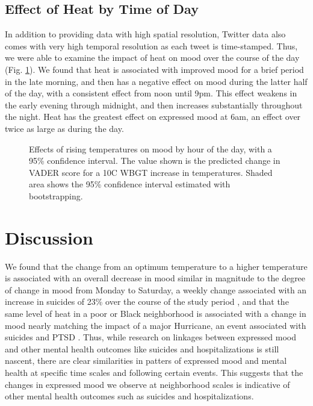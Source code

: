 \documentclass[titlepage]{article}
\begin{document}
\subsection*{Effect of Heat by Time of Day}
In addition to providing data with high spatial resolution, Twitter data also comes with very high temporal resolution as each tweet is time-stamped. Thus, we were able to examine the impact of heat on mood over the course of the day (Fig. \ref{fig:ts-wbgt}). We found that heat is associated with improved mood for a brief period in the late morning, and then has a negative effect on mood during the latter half of the day, with a consistent effect from noon until 9pm. This effect weakens in the early evening through midnight, and then increases substantially throughout the night. Heat has the greatest effect on expressed mood at 6am, an effect over twice as large as during the day.

\begin{figure}[H]
 \centering
 \caption{Effects of rising temperatures on mood by hour of the day, with a 95\% confidence interval. The value shown is the predicted change in VADER score for a 10\textdegree C WBGT increase in temperatures. Shaded area shows the 95\% confidence interval estimated with bootstrapping.}
 \label{fig:ts-wbgt}
\end{figure}

\section*{Discussion}
We found that the change from an optimum temperature to a higher temperature is associated with an overall decrease in mood similar in magnitude to the degree of change in mood from Monday to Saturday, a weekly change associated with an increase in suicides of 23\% over the course of the study period \citep{CDC2021}, and that the same level of heat in a poor or Black neighborhood is associated with a change in mood nearly matching the impact of a major Hurricane, an event associated with suicides and PTSD \citep{Schwartz2017Aug, Lieberman-Cribbin2017}.  Thus, while research on linkages between expressed mood and other mental health outcomes like suicides and hospitalizations is still nascent, there are clear similarities in patters of expressed mood and mental health at specific time scales and following certain events.  This suggests that the changes in expressed mood we observe at neighborhood scales is indicative of other mental health outcomes such as suicides and hospitalizations.
\end{document}
